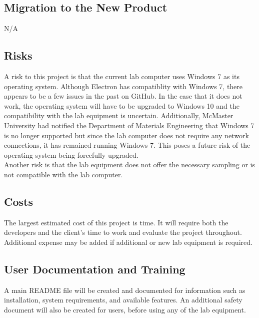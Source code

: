 \documentclass[12pt, titlepage]{article}
\begin{document}
\subsection{Migration to the New Product}
N/A

\subsection{Risks}
A risk to this project is that the current lab computer uses Windows 7 as its operating system. Although Electron has compatiblity with Windows 7, there appears to be a few issues in the past on GitHub. 
In the case that it does not work, the operating system will have to be upgraded to Windows 10 and the compatibility with the lab equipment is uncertain. Additionally, McMaster University had notified the 
Department of Materials Engineering that Windows 7 is no longer supported but since the lab computer does not require any network connections, it has remained running Windows 7. This poses a future risk of 
the operating system being forcefully upgraded.\\

\noindent Another risk is that the lab equipment does not offer the necessary sampling or is not compatible with the lab computer. 

\subsection{Costs}
The largest estimated cost of this project is time. It will require both the developers and the client's time to work and evaluate the project throughout.
Additional expense may be added if additional or new lab equipment is required. 

\subsection{User Documentation and Training}
A main README file will be created and documented for information such as installation, system requirements, and available features. 
An additional safety document will also be created for users, before using any of the lab equipment. 
\end{document}
